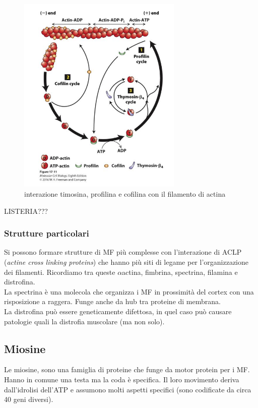             \begin{figure}[h]
                \centering
                \includegraphics[width=0.7\textwidth]{images/agentiActina.JPG}
                \caption{\small interazione timosina, profilina e cofilina con il filamento di actina}
                \label{fig:mesh1}
            \end{figure}
            LISTERIA???
            
        \subsubsection{Strutture particolari}
            Si possono formare strutture di MF più complesse con l'interazione di ACLP (\textit{actine cross linking proteins}) che hanno più siti di legame per l'organizzazione dei filamenti. Ricordiamo tra queste $\alpha$actina, fimbrina, spectrina, filamina e distrofina.   \\
            La spectrina è una molecola che organizza i MF in prossimità del cortex con una risposizione a raggera. Funge anche da hub tra proteine di membrana.\\
            La distrofina può essere geneticamente difettosa, in quel caso può causare patologie quali la distrofia muscolare (ma non solo).
            
    \subsection{Miosine}
        Le miosine, sono una famiglia di proteine che funge da motor protein per i MF. Hanno in comune una testa ma la coda è specifica. Il loro movimento deriva dall'idrolisi dell'ATP e assumono molti aspetti specifici (sono codificate da circa 40 geni diversi).
